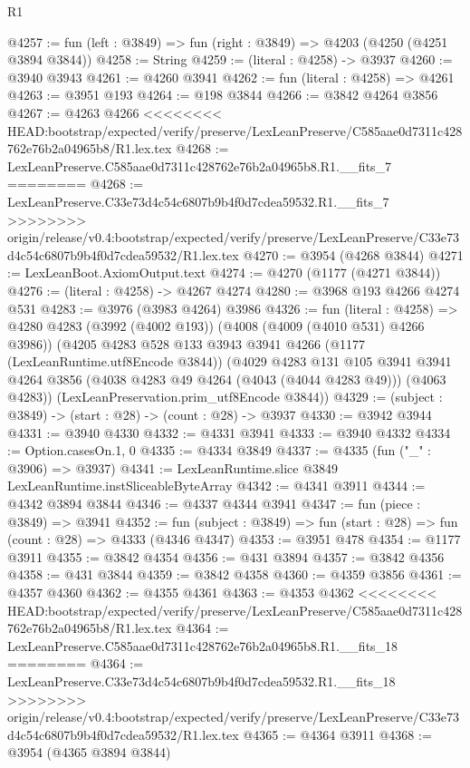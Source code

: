 \begin{lexlean}{R1}
\begin{coremodule}
{{{{{{{{{{{{{{{{{{{{{{{{{{{{{{{{{{{{{{{{{{{{{{{{{{{{{{{{{{{{{{{{{{{{{{{{{{{{{{{{{{{{{{{{{{{{{{{{{{{{{{{{{{{{{{{{{{{{{{{{{{{{{{{{{{{{{{{{{{{{{{{{{{{{{{{{{{{{{{{{{{{{{{{{{{{{{{{{{{{{{{{{{{@4257 := fun (left : @3849) => fun (right : @3849) => @4203 (@4250 (@4251 @3894 @3844))
@4258 := String
@4259 := (literal : @4258) -> @3937
@4260 := @3940 @3943
@4261 := @4260 @3941
@4262 := fun (literal : @4258) => @4261
@4263 := @3951 @193
@4264 := @198 @3844
@4266 := @3842 @4264 @3856
@4267 := @4263 @4266
<<<<<<<< HEAD:bootstrap/expected/verify/preserve/LexLeanPreserve/C585aae0d7311c428762e76b2a04965b8/R1.lex.tex
@4268 := LexLeanPreserve.C585aae0d7311c428762e76b2a04965b8.R1.__fits_7
========
@4268 := LexLeanPreserve.C33e73d4c54c6807b9b4f0d7cdea59532.R1.__fits_7
>>>>>>>> origin/release/v0.4:bootstrap/expected/verify/preserve/LexLeanPreserve/C33e73d4c54c6807b9b4f0d7cdea59532/R1.lex.tex
@4270 := @3954 (@4268 @3844)
@4271 := LexLeanBoot.AxiomOutput.text
@4274 := @4270 (@1177 (@4271 @3844))
@4276 := (literal : @4258) -> @4267 @4274
@4280 := @3968 @193 @4266 @4274 @531
@4283 := @3976 (@3983 @4264) @3986
@4326 := fun (literal : @4258) =>
  @4280
    @4283
    (@3992 (@4002 @193))
    (@4008 (@4009 (@4010 @531) @4266 @3986))
    (@4205
      @4283
      @528
      @133
      @3943
      @3941
      @4266
      (@1177 (LexLeanRuntime.utf8Encode @3844))
      (@4029
        @4283
        @131
        @105
        @3941
        @3941
        @4264
        @3856
        (@4038 @4283 @49 @4264 (@4043 (@4044 @4283 @49)))
        (@4063 @4283))
      (LexLeanPreservation.prim_utf8Encode @3844))
@4329 := (subject : @3849) -> (start : @28) -> (count : @28) -> @3937
@4330 := @3942 @3944
@4331 := @3940 @4330
@4332 := @4331 @3941
@4333 := @3940 @4332
@4334 := Option.casesOn.{1, 0}
@4335 := @4334 @3849
@4337 := @4335 (fun ("_" : @3906) => @3937)
@4341 := LexLeanRuntime.slice @3849 LexLeanRuntime.instSliceableByteArray
@4342 := @4341 @3911
@4344 := @4342 @3894 @3844
@4346 := @4337 @4344 @3941
@4347 := fun (piece : @3849) => @3941
@4352 := fun (subject : @3849) => fun (start : @28) => fun (count : @28) => @4333 (@4346 @4347)
@4353 := @3951 @478
@4354 := @1177 @3911
@4355 := @3842 @4354
@4356 := @431 @3894
@4357 := @3842 @4356
@4358 := @431 @3844
@4359 := @3842 @4358
@4360 := @4359 @3856
@4361 := @4357 @4360
@4362 := @4355 @4361
@4363 := @4353 @4362
<<<<<<<< HEAD:bootstrap/expected/verify/preserve/LexLeanPreserve/C585aae0d7311c428762e76b2a04965b8/R1.lex.tex
@4364 := LexLeanPreserve.C585aae0d7311c428762e76b2a04965b8.R1.__fits_18
========
@4364 := LexLeanPreserve.C33e73d4c54c6807b9b4f0d7cdea59532.R1.__fits_18
>>>>>>>> origin/release/v0.4:bootstrap/expected/verify/preserve/LexLeanPreserve/C33e73d4c54c6807b9b4f0d7cdea59532/R1.lex.tex
@4365 := @4364 @3911
@4368 := @3954 (@4365 @3894 @3844)
}}}}}}}}}}}}}}}}}}}}}}}}}}}}}}}}}}}}}}}}}}}}}}}}}}}}}}}}}}}}}}}}}}}}}}}}}}}}}}}}}}}}}}}}}}}}}}}}}}}}}}}}}}}}}}}}}}}}}}}}}}}}}}}}}}}}}}}}}}}}}}}}}}}}}}}}}}}}}}}}}}}}}}}}}}}}}}}}}}}}}}}}}}
\end{coremodule}
\end{lexlean}
